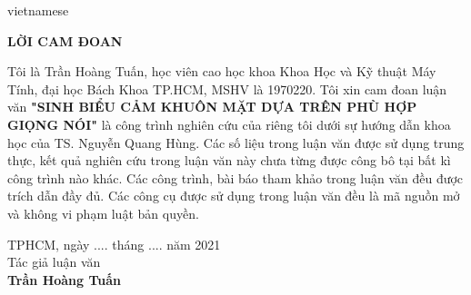 \begin{titlepage}
\begin{otherlanguage*}{vietnamese}

\begin{center}
    \fontsize{18}{18}\textbf{LỜI CAM ĐOAN}
\end{center}

Tôi là Trần Hoàng Tuấn, học viên cao học khoa Khoa Học và Kỹ thuật Máy Tính, đại học Bách Khoa TP.HCM, MSHV là 1970220. Tôi xin cam đoan luận văn \textbf{"SINH BIỂU CẢM KHUÔN MẶT DỰA TRÊN PHÙ HỢP GIỌNG NÓI"} là công trình nghiên cứu của riêng tôi dưới sự hướng dẫn khoa học của TS. Nguyễn Quang Hùng. Các số liệu trong luận văn được sử dụng trung thực, kết quả nghiên cứu trong luận văn này chưa từng được công bô tại bất kì công trình nào khác. Các công trình, bài báo tham khảo trong luận văn đều được trích dẫn đầy đủ. Các công cụ được sử dụng trong luận văn đều là mã nguồn mở và không vi phạm luật bản quyền.

\begin{flushright}
    \begin{minipage}[t]{0.50\textwidth}
    \begin{center}
        TPHCM, ngày .... tháng .... năm 2021\\
        Tác giả luận văn\\
        \vspace{3cm}
        \textbf{Trần Hoàng Tuấn}
    \end{center}
    \end{minipage}
\end{flushright}


\end{otherlanguage*}
\vfill
\end{titlepage}